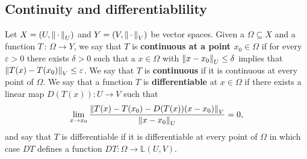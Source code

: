 \documentclass[../main.tex]{subfiles}
\begin{document}
\subsection{Continuity and differentiablility}
\begin{definition}
Let $X = (U,\norm{\, \cdot \,}_U)$ and $Y = (V,\norm{\, \cdot \,}_V)$ be vector spaces. Given a $\Omega \subseteq X$ and a function $T \, : \, \Omega \rightarrow Y$, we say that $T$ is \textbf{continuous at a point $x_0 \in \Omega$} if for every $\varepsilon > 0$ there exists $\delta > 0$ such that a $x \in \Omega$ with $\norm{x - x_0}_U \leq \delta$ implies that $\norm{T(x) - T(x_0)}_V \leq \varepsilon$. We say that $T$ is \textbf{continuous} if it is continuous at every point of $\Omega$. 
We say that a function $T$ is \textbf{differentiable} at $x \in \Omega$ if there exists a linear map $D(T(x)) : U \rightarrow V$ such that 
\begin{equation}
    \lim_{x \rightarrow x_0} \frac{\norm{T(x) - T(x_0) - D(T(x))(x - x_0)}_V}{\norm{x - x_0}_U} = 0, 
\end{equation}
and say that $T$ is differentiable if it is differentiable at every point of $\Omega$ in which case $DT$ defines a function $DT:\Omega \rightarrow \mathbb{L}(U, V)$. 
\end{definition}



\begin{prop}

\end{prop}
\end{document}
